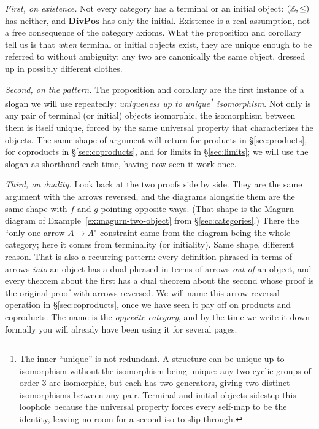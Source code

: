 \textit{First, on existence.} Not every category has a terminal or an
initial object: $({\mathbb{Z}}, \leq)$ has neither, and $\mathbf{DivPos}$ has only
the initial. Existence is a real assumption, not a free consequence of
the category axioms. What the proposition and corollary tell us is that
\textit{when} terminal or initial objects exist, they are unique enough
to be referred to without ambiguity: any two are canonically the same
object, dressed up in possibly different clothes.

\textit{Second, on the pattern.} The proposition and corollary are the
first instance of a slogan we will use repeatedly: \textit{uniqueness
up to unique\footnote{The inner ``unique'' is not redundant. A
structure can be unique up to isomorphism without the isomorphism
being unique: any two cyclic groups of order $3$ are isomorphic, but
each has two generators, giving two distinct isomorphisms between any
pair. Terminal and initial objects sidestep this loophole because the
universal property forces every self-map to be the identity, leaving
no room for a second iso to slip through.}
isomorphism}.
Not only is any pair of terminal (or initial) objects isomorphic, the
isomorphism between them is itself unique, forced by the same universal
property that characterizes the objects. The same shape of argument
will return for products in \S\ref{sec:products}, for coproducts in
\S\ref{sec:coproducts}, and for limits in \S\ref{sec:limits}; we will
use the slogan as shorthand each time, having now seen it work once.

\textit{Third, on duality.} Look back at the two proofs side by side.
They are the same argument with the arrows reversed, and the diagrams
alongside them are the same shape with $f$ and $g$ pointing opposite
ways. (That shape is the Magurn diagram of
Example~\ref{ex:magurn-two-object} from \S\ref{sec:categories}.) There
the ``only one arrow $A \to A$" constraint came from the diagram being
the whole category; here it comes from terminality (or initiality). Same
shape, different reason. That is also a recurring
pattern: every definition phrased in terms of arrows \textit{into} an
object has a dual phrased in terms of arrows \textit{out of} an
object, and every theorem about the first has a dual theorem about the
second whose proof is the original proof with arrows reversed. We will name this arrow-reversal operation in
\S\ref{sec:coproducts}, once we have seen it pay off on products and
coproducts. The name is the \textit{opposite category}, and by the time we write it down formally you will already
have been using it for several pages.

